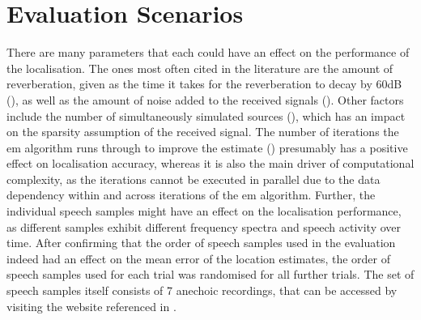 \section{Evaluation Scenarios}
There are many parameters that each could have an effect on the performance of the localisation. The ones most often cited in the literature are the amount of reverberation, given as the time it takes for the reverberation to decay by 60dB (\Tsixty), as well as the amount of noise added to the received signals (). Other factors include the number of simultaneously simulated sources (), which has an impact on the sparsity assumption of the received signal. The number of iterations the \gls{em} algorithm runs through to improve the estimate () presumably has a positive effect on localisation accuracy, whereas it is also the main driver of computational complexity, as the iterations cannot be executed in parallel due to the data dependency within and across iterations of the \gls{em} algorithm. Further, the individual speech samples might have an effect on the localisation performance, as different samples exhibit different frequency spectra and speech activity over time. After confirming that the order of speech samples used in the evaluation indeed had an effect on the mean error of the location estimates, the order of speech samples used for each trial was randomised for all further trials. The set of speech samples itself consists of 7 anechoic recordings, that can be accessed by visiting the website referenced in \cite{Mainczyk2017}.

